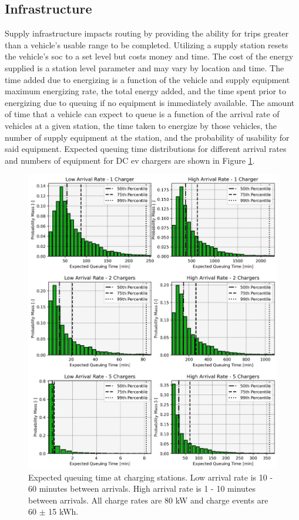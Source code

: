 \documentclass[11pt]{article}
\begin{document}
\begin{multicols}{2}
\subsection*{Infrastructure}

Supply infrastructure impacts routing by providing the ability for trips greater than a vehicle's usable range to be completed. Utilizing a supply station resets the vehicle's \gls{soc} to a set level but costs money and time. The cost of the energy supplied is a station level parameter and may vary by location and time. The time added due to energizing is a function of the vehicle and supply equipment maximum energizing rate, the total energy added, and the time spent prior to energizing due to queuing if no equipment is immediately available. The amount of time that a vehicle can expect to queue is a function of the arrival rate of vehicles at a given station, the time taken to energize by those vehicles, the number of supply equipment at the station, and the probability of usability for said equipment. Expected queuing time distributions for different arrival rates and numbers of equipment for DC \gls{ev} chargers are shown in Figure \ref{fig:expected_delay}.

\begin{figure}[H]
	\centering
	\includegraphics[width = \linewidth]{figs/expected_delay.png}
	\caption{Expected queuing time at charging stations. Low arrival rate is 10 - 60 minutes between arrivals. High arrival rate is 1 - 10 minutes between arrivals. All charge rates are 80 kW and charge events are 60 $\pm$ 15 kWh.}
	\label{fig:expected_delay}
\end{figure}


\end{multicols}
\end{document}
